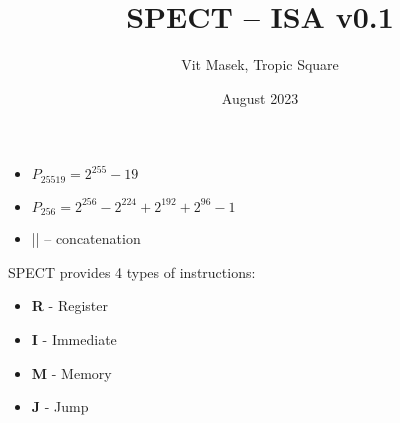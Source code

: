 \documentclass{tropic_design_spec}
\title{SPECT -- ISA v0.1}
\author{Vit Masek, Tropic Square}
\date{August 2023}
\begin{document}
\def \projectname {SPECT}
\def \documentname {ISA v0.1}
\def \versionnumber {0.1}

\maketitle

\newcommand{\tspar}{\par\vspace{0.5cm}}
\newcommand{\tsspc}{\vspace{0.5cm}}
\newcommand{\tsblank}{\hspace*{0.5cm}}
\newcommand{\bi}[1]{\textbf{\textit{#1}}}

\newcommand{\tsnlind}{\newline\tsblank}

\newcommand{\tsif}{\textbf{\textit{if }}}
\newcommand{\tsthen}{\textbf{\textit{then: }}}
\newcommand{\tselse}{\newline\textbf{\textit{else: }}}



\begin{itemize}
    \item{$P_{25519} = 2^{255} - 19$}
    \item{$P_{256} = 2^{256} - 2^{224} + 2^{192} + 2^{96} - 1$}
    \item{|| -- concatenation}
\end{itemize}



SPECT provides 4 types of instructions:
\begin{itemize}
    \item{\textbf{R} - Register}
    \item{\textbf{I} - Immediate}
    \item{\textbf{M} - Memory}
    \item{\textbf{J} - Jump}
\end{itemize}
\end{document}
